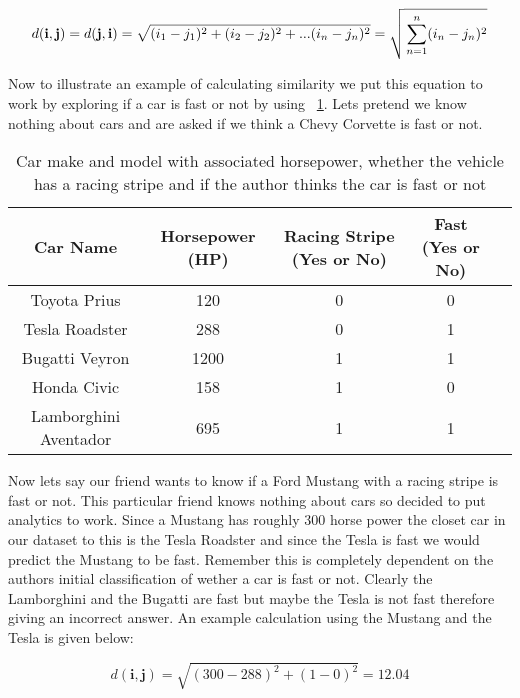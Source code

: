 \[{d(\mathbf{i},\mathbf{j})} = {d(\mathbf{j},\mathbf{i})} =
\sqrt{{(i_1 - j_1)^2 + (i_2 - j_2)^2 +... (i_n - j_n)^2 } }  =
\sqrt{\sideset{}{}\sum_{n=1}^n(i_n - j_n)^2}\]

Now to illustrate an example of calculating similarity we put this
equation to work by exploring if a car is fast or not by using
~\ref{T:fast-cars}. Lets pretend we know nothing about cars and are
asked if we think a Chevy Corvette is fast or not.  

\begin{table}[htb]
\caption{Car make and model with associated horsepower, whether the
  vehicle has a racing stripe and if the author thinks the car is fast
or not}\label{T:fast-cars}
\bigskip
\begin{center}
\begin{tabular}{ c c c c c }
 Car Name  & Horsepower (HP)  & Racing Stripe (Yes or No) & Fast (Yes
                                                           or No) \\
\toprule
 Toyota Prius & 120 & 0 & 0 \\ 
 Tesla Roadster& 288 & 0 & 1 \\  
 Bugatti  Veyron& 1200 & 1 & 1 \\
 Honda Civic & 158 & 1 & 0 \\
 Lamborghini Aventador & 695 & 1 & 1 \\

\bottomrule
\end{tabular}
\end{center}
\end{table}

Now lets say our friend wants to know if a Ford Mustang with a racing
stripe is fast or not. This particular friend knows nothing about cars
so decided to put analytics to work. Since a Mustang has roughly 300
horse power the closet car in our dataset to this is the Tesla
Roadster and since the Tesla is fast we would predict the Mustang to
be fast. Remember this is completely dependent on the authors initial
classification of wether a car is fast or not. Clearly the Lamborghini
and the Bugatti are fast but maybe the Tesla is not fast therefore
giving an incorrect answer. An example calculation using the Mustang
and the Tesla is given below: 

\[{d(\mathbf{i},\mathbf{j})}  =
\sqrt{{(300 - 288)^2 + (1 - 0)^2 } }  = 12.04\]

